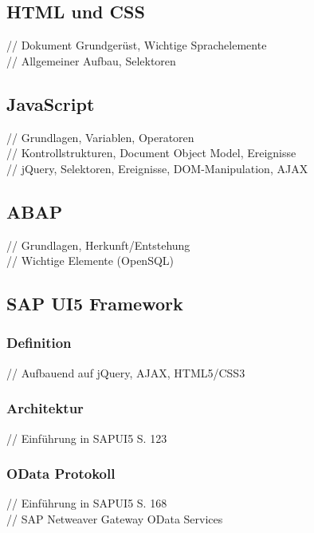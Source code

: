\documentclass[12pt,a4paper,bibliography=totocnumbered,listof=totocnumbered]{scrartcl}
\begin{document}
\subsection{HTML und CSS}
// Dokument Grundgerüst, Wichtige Sprachelemente\\
// Allgemeiner Aufbau, Selektoren\\

\subsection{JavaScript}
// Grundlagen, Variablen, Operatoren\\
// Kontrollstrukturen, Document Object Model, Ereignisse\\
// jQuery, Selektoren, Ereignisse, DOM-Manipulation, AJAX\\

\subsection{ABAP}
// Grundlagen, Herkunft/Entstehung\\
// Wichtige Elemente (OpenSQL)\\

\subsection{SAP UI5 Framework}
\subsubsection{Definition}
// Aufbauend auf jQuery, AJAX, HTML5/CSS3 \cite{AntoEinf2014}\\

\subsubsection{Architektur}
// Einführung in SAPUI5 S. 123 \cite{AntoEinf2014}\\

\subsubsection{OData Protokoll}
// Einführung in SAPUI5 S. 168 \\
// SAP Netweaver Gateway OData Services\\

\pagebreak
\end{document}
